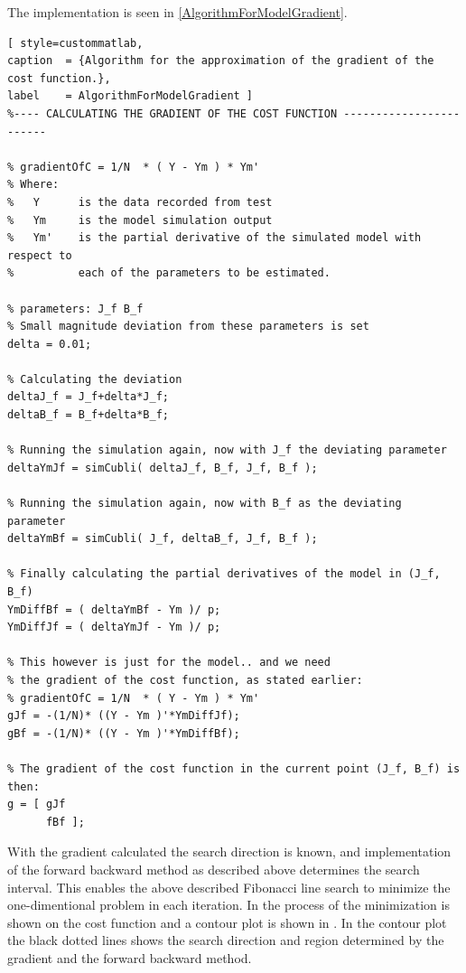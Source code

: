 The implementation is seen in \autoref{AlgorithmForModelGradient}.
\begin{lstlisting}[ style=custommatlab,
caption  = {Algorithm for the approximation of the gradient of the cost function.},
label    = AlgorithmForModelGradient ]
%---- CALCULATING THE GRADIENT OF THE COST FUNCTION ------------------------

% gradientOfC = 1/N  * ( Y - Ym ) * Ym' 
% Where:
%   Y      is the data recorded from test
%   Ym     is the model simulation output
%   Ym'    is the partial derivative of the simulated model with respect to
%          each of the parameters to be estimated.

% parameters: J_f B_f
% Small magnitude deviation from these parameters is set
delta = 0.01;

% Calculating the deviation
deltaJ_f = J_f+delta*J_f;
deltaB_f = B_f+delta*B_f;

% Running the simulation again, now with J_f the deviating parameter
deltaYmJf = simCubli( deltaJ_f, B_f, J_f, B_f );

% Running the simulation again, now with B_f as the deviating parameter
deltaYmBf = simCubli( J_f, deltaB_f, J_f, B_f );

% Finally calculating the partial derivatives of the model in (J_f, B_f)
YmDiffBf = ( deltaYmBf - Ym )/ p;
YmDiffJf = ( deltaYmJf - Ym )/ p;

% This however is just for the model.. and we need
% the gradient of the cost function, as stated earlier:
% gradientOfC = 1/N  * ( Y - Ym ) * Ym'
gJf = -(1/N)* ((Y - Ym )'*YmDiffJf);
gBf = -(1/N)* ((Y - Ym )'*YmDiffBf);

% The gradient of the cost function in the current point (J_f, B_f) is then:
g = [ gJf
      fBf ];
\end{lstlisting}

With the gradient calculated the search direction is known, and implementation of the forward backward method as described above determines the search interval. This enables the above described Fibonacci line search to minimize the one-dimentional problem in each iteration. In  the process of the minimization is shown on the cost function and a contour plot is shown in . In the contour plot the black dotted lines shows the search direction and region determined by the gradient and the forward backward method.

